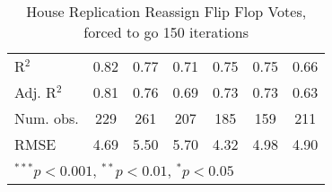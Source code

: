 \documentclass[12pt]{article}
\begin{document}
\begin{table}
\begin{center}
\begin{tabular}{l c c c c c c }
			\hline
			R$^2$                       & 0.82          & 0.77          & 0.71           & 0.75           & 0.75           & 0.66           \\
			Adj. R$^2$                  & 0.81          & 0.76          & 0.69           & 0.73           & 0.73           & 0.63           \\
			Num. obs.                   & 229           & 261           & 207            & 185            & 159            & 211            \\
			RMSE                        & 4.69          & 5.50          & 5.70           & 4.32           & 4.98           & 4.90           \\
			\hline
			\multicolumn{7}{l}{\scriptsize{$^{***}p<0.001$, $^{**}p<0.01$, $^*p<0.05$}}
		\end{tabular}
		\caption{House Replication Reassign Flip Flop Votes, forced to go 150 iterations}
		\label{table:house coefficients}
	\end{center}
\end{table}
	
\end{document}
